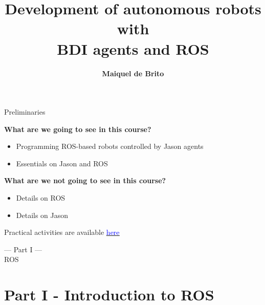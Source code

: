 \documentclass[compress]{beamer}
\title[]{Development of autonomous robots with \\ BDI agents and ROS
}
\author[]{{\bf Maiquel de Brito}}
\institute{%
\begin{minipage}[t]{.3\linewidth}\centering
\inst{1}UFSC-Blumenau-Brasil\\
\texttt{maiquel.b@ufsc.br}
\end{minipage}

}
\date{
\begin{columns}
 \column{.2\textwidth}
 \column{.6\textwidth}
 \begin{center}
 \end{center}
 \column{.2\textwidth}
 
\end{columns}

}
\newcommand{\link}[2]{\href{#1}{\underline{\textcolor{blue}{#2}}}}
\begin{document}
\begin{frame}[plain]
  \titlepage
\end{frame}



\begin{frame}{Preliminaries}
 
    {\bf What are we going to see in this course?}
    \begin{itemize}\scriptsize
        \item Programming ROS-based robots controlled by Jason agents
        \item Essentials on Jason and ROS
    \end{itemize}
    
    
    \vspace{1cm}
    
    {\bf What are we not going to see in this course?}
    \begin{itemize}\scriptsize
     \item Details on ROS
     \item Details on Jason
    \end{itemize}

    
    \vfill
    
 {\tiny Practical activities are available \link{https://github.com/embedded-mas/jason-ros-course-wesaac2024/blob/main/README.adoc}{here}} 

 
 
\end{frame}

\begin{frame}
 

 \HUGE
\centering
--- Part I ---\\
ROS 
 
\end{frame}



\section{Part I - Introduction to ROS}
\end{document}
